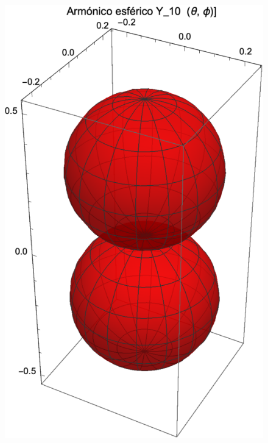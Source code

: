 \documentclass[12pt]{beamer}
\begin{document}
\begin{frame}[plain]
\begin{figure}
    \centering
    \includegraphics[scale=0.65]{Imagenes/Armonicos_Esfericos_10.eps}
\end{figure}
\end{frame}
\end{document}
